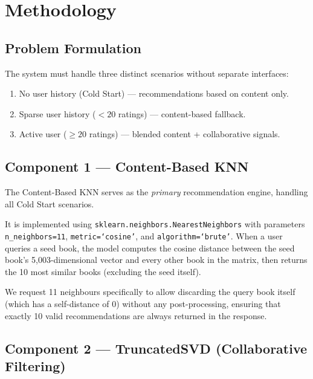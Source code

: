 \documentclass[12pt, a4paper]{article}
\begin{document}
\newpage
\section{Methodology}
\label{sec:methodology}

\subsection{Problem Formulation}

The system must handle three distinct scenarios without separate interfaces:
\begin{enumerate}[leftmargin=2cm]
  \item No user history (Cold Start) --- recommendations based on content only.
  \item Sparse user history ($<20$ ratings) --- content-based fallback.
  \item Active user ($\geq 20$ ratings) --- blended content + collaborative signals.
\end{enumerate}

\subsection{Component 1 --- Content-Based KNN}
\label{sec:knn}

The Content-Based KNN serves as the \textit{primary} recommendation engine, handling all Cold Start scenarios.

It is implemented using \texttt{sklearn.neighbors.NearestNeighbors} with parameters
\texttt{n\_neighbors=11}, \texttt{metric=`cosine'}, and \texttt{algorithm=`brute'}.
When a user queries a seed book, the model computes the cosine distance between
the seed book's 5,003-dimensional vector and every other book in the matrix,
then returns the 10 most similar books (excluding the seed itself).

We request 11 neighbours specifically to allow discarding the query book itself
(which has a self-distance of 0) without any post-processing, ensuring that
exactly 10 valid recommendations are always returned in the response.

\subsection{Component 2 --- TruncatedSVD (Collaborative Filtering)}
\label{sec:svd}
\end{document}
